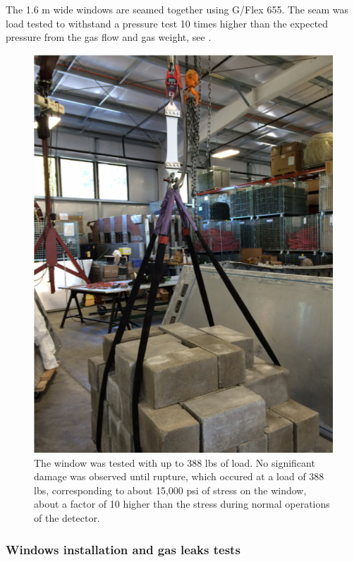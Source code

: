 The 1.6 m wide windows are seamed together using G/Flex 655. The seam was load tested to withstand a pressure test 10 times
higher than the expected pressure from the gas flow and gas weight, see .


\begin{figure}
	\centering
	\includegraphics[width=1.0\columnwidth,keepaspectratio]{img/windowTest.png}
	\caption{The window was tested with up to 388 lbs of load. No significant damage was observed until rupture, which occured at a load of 388 lbs,
			   corresponding to about 15,000 psi of stress on the window, about a factor of 10 higher than the stress during normal operations of the detector.}
	\label{fig:windowTest}
\end{figure}

\subsubsection{Windows installation and gas leaks tests}

